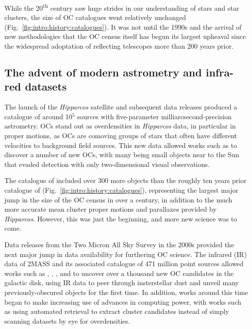 While the 20\textsuperscript{th} century saw huge strides in our understanding of stars and star clusters, the size of OC catalogues went relatively unchanged (Fig.~\ref{fig:intro:history:catalogues}). It was not until the 1990s and the arrival of new methodologies that the OC census itself has begun its largest upheaval since the widespread adoptation of reflecting telescopes more than 200 years prior.


\subsection{The advent of modern astrometry and infra-red datasets}

The launch of the \emph{Hipparcos} satellite and subsequent data releases \citep{perryman_hipparcos_1997} produced a catalogue of around 10$^5$ sources with five-parameter milliarcsecond-precision astrometry. OCs stand out as overdensities in \emph{Hipparcos} data, in particular in proper motions, as OCs are comoving groups of stars that often have different velocities to background field sources. This new data allowed works such as \cite{platais_search_1998} to discover a number of new OCs, with many being small objects near to the Sun that evaded detection with only two-dimensional visual observations. 

The catalogue of \cite{dias_new_2002} included over 300 more objects than the roughly ten years prior catalogue of \cite{mermilliod_database_1995} (Fig.~\ref{fig:intro:history:catalogues}), representing the largest 
major jump in the size of the OC census in over a century, in addition to the much more accurate mean cluster proper motions and parallaxes provided by \emph{Hipparcos}. However, this was just the beginning, and more new science was to come.

Data releases from the Two Micron All Sky Survey \citep[2MASS,][]{skrutskie_two_2006} in the 2000s provided the next major jump in data availability for furthering OC science. The infrared (IR) data of 2MASS and its associated catalogue of 471 million point sources allowed works such as \cite{dutra_new_2001}, \cite{dutra_new_infrared_2003}, \cite{bica_new_infrared_2003}, and \cite{froebrich_systematic_2007} to uncover over a thousand new OC candidates in the galactic disk, using IR data to peer through insterstellar dust and unveil many previously-obscured objects for the first time. In addition, works around this time began to make increasing use of advances in computing power, with works such as \cite{froebrich_systematic_2007} using automated retrieval to extract cluster candidates instead of simply scanning datasets by eye for overdensities.


